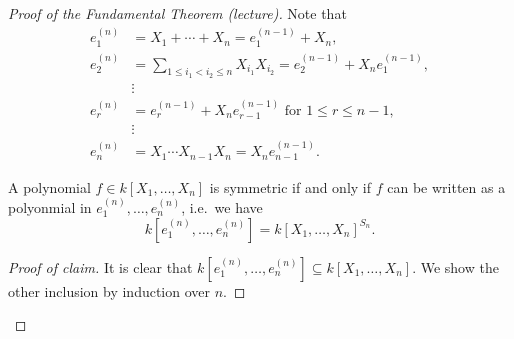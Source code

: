 \begin{proof}[Proof of the Fundamental Theorem (lecture)]
 Note that
 \begin{align*}
  e^{(n)}_1 &= X_1 + \dotsb + X_n = e_1^{(n-1)} + X_n, \\
  e^{(n)}_2 &= \sum_{1 \leq i_1 < i_2 \leq n} X_{i_1} X_{i_2} = e_2^{(n-1)} + X_n e_1^{(n-1)}, \\
            &\vdots \tag{$\ast$}\\ 
  e^{(n)}_r &= e^{(n-1)}_r + X_n e^{(n-1)}_{r-1} \text{ for } 1 \leq r \leq n-1, \\
            &\vdots \\
  e^{(n)}_n &= X_1 \dotsm X_{n-1} X_n = X_n e^{(n-1)}_{n-1}.
 \end{align*}
 \begin{claim}
  A polynomial $f \in k[X_1, \dotsc, X_n]$ is symmetric if and only if $f$ can be written as a polyonmial in $e^{(n)}_1, \dotsc, e^{(n)}_n$, i.e.\ we have
  \[
   k\left[e^{(n)}_1, \dotsc, e^{(n)}_n\right] = k[X_1, \dotsc, X_n]^{S_n}.
  \]
 \end{claim}
 \begin{proof}[Proof of claim]
  It is clear that $k\left[e^{(n)}_1, \dotsc, e^{(n)}_n\right] \subseteq k[X_1, \dotsc, X_n]$. We show the other inclusion by induction over $n$.
  

\end{proof}
\end{proof}
